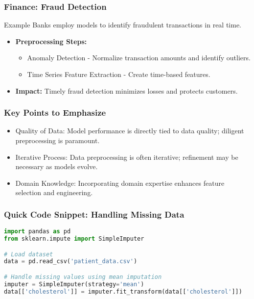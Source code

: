 \documentclass{beamer}
\begin{document}
\begin{frame}[fragile]
    \frametitle{Finance: Fraud Detection}
    \begin{block}{Example}
        Banks employ models to identify fraudulent transactions in real time.
    \end{block}
    \begin{itemize}
        \item \textbf{Preprocessing Steps:}
        \begin{itemize}
            \item Anomaly Detection - Normalize transaction amounts and identify outliers.
            \item Time Series Feature Extraction - Create time-based features.
        \end{itemize}
        \item \textbf{Impact:} Timely fraud detection minimizes losses and protects customers.
    \end{itemize}
\end{frame}

\begin{frame}[fragile]
    \frametitle{Key Points to Emphasize}
    \begin{itemize}
        \item Quality of Data: Model performance is directly tied to data quality; diligent preprocessing is paramount.
        \item Iterative Process: Data preprocessing is often iterative; refinement may be necessary as models evolve.
        \item Domain Knowledge: Incorporating domain expertise enhances feature selection and engineering.
    \end{itemize}
\end{frame}

\begin{frame}[fragile]
    \frametitle{Quick Code Snippet: Handling Missing Data}
    \begin{lstlisting}[language=Python]
import pandas as pd
from sklearn.impute import SimpleImputer

# Load dataset
data = pd.read_csv('patient_data.csv')

# Handle missing values using mean imputation
imputer = SimpleImputer(strategy='mean')
data[['cholesterol']] = imputer.fit_transform(data[['cholesterol']])
    \end{lstlisting}
\end{frame}
\end{document}

